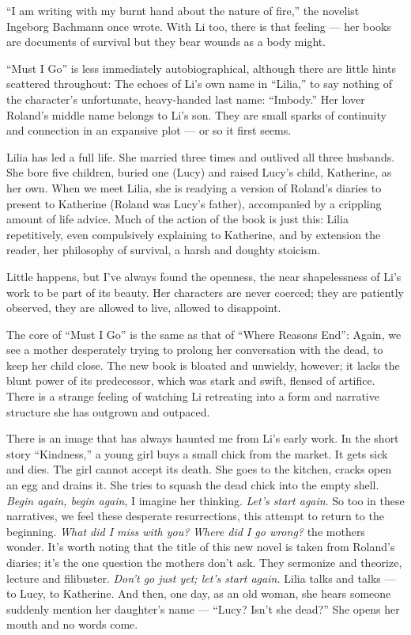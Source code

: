 ``I am writing with my burnt hand about the nature of fire,'' the
novelist Ingeborg Bachmann once wrote. With Li too, there is that
feeling --- her books are documents of survival but they bear wounds as
a body might.

``Must I Go'' is less immediately autobiographical, although there are
little hints scattered throughout: The echoes of Li's own name in
``Lilia,'' to say nothing of the character's unfortunate, heavy-handed
last name: ``Imbody.'' Her lover Roland's middle name belongs to Li's
son. They are small sparks of continuity and connection in an expansive
plot --- or so it first seems.

Lilia has led a full life. She married three times and outlived all
three husbands. She bore five children, buried one (Lucy) and raised
Lucy's child, Katherine, as her own. When we meet Lilia, she is readying
a version of Roland's diaries to present to Katherine (Roland was Lucy's
father), accompanied by a crippling amount of life advice. Much of the
action of the book is just this: Lilia repetitively, even compulsively
explaining to Katherine, and by extension the reader, her philosophy of
survival, a harsh and doughty stoicism.

Little happens, but I've always found the openness, the near
shapelessness of Li's work to be part of its beauty. Her characters are
never coerced; they are patiently observed, they are allowed to live,
allowed to disappoint.

The core of ``Must I Go'' is the same as that of ``Where Reasons End'':
Again, we see a mother desperately trying to prolong her conversation
with the dead, to keep her child close. The new book is bloated and
unwieldy, however; it lacks the blunt power of its predecessor, which
was stark and swift, flensed of artifice. There is a strange feeling of
watching Li retreating into a form and narrative structure she has
outgrown and outpaced.

There is an image that has always haunted me from Li's early work. In
the short story ``Kindness,'' a young girl buys a small chick from the
market. It gets sick and dies. The girl cannot accept its death. She
goes to the kitchen, cracks open an egg and drains it. She tries to
squash the dead chick into the empty shell. \emph{Begin again, begin
again}, I imagine her thinking. \emph{Let's start again}. So too in
these narratives, we feel these desperate resurrections, this attempt to
return to the beginning. \emph{What did I miss with you?} \emph{Where
did I go wrong?} the mothers wonder. It's worth noting that the title of
this new novel is taken from Roland's diaries; it's the one question the
mothers don't ask. They sermonize and theorize, lecture and filibuster.
\emph{Don't go just yet; let's start again.} Lilia talks and talks ---
to Lucy, to Katherine. And then, one day, as an old woman, she hears
someone suddenly mention her daughter's name --- ``Lucy? Isn't she
dead?'' She opens her mouth and no words come.

